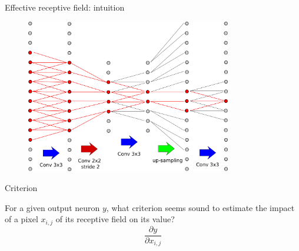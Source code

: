 \documentclass[xcolor=pdftex,dvipsnames,table,mathserif]{beamer}
\begin{document}
\begin{frame}{Effective receptive field: intuition}

  \begin{figure}
    \includegraphics[width=0.8\textwidth]{receptive_field3.png}
  \end{figure}

\end{frame}

\begin{frame}{Criterion}

  \begin{block}{}For a given output neuron $y$, what criterion seems sound to estimate the impact of a pixel $x_{i,j}$ of its receptive field on its value?
\pause
    \[ \frac{\partial y}{\partial x_{i,j}} \]


  \end{block}

\end{frame}
\end{document}
